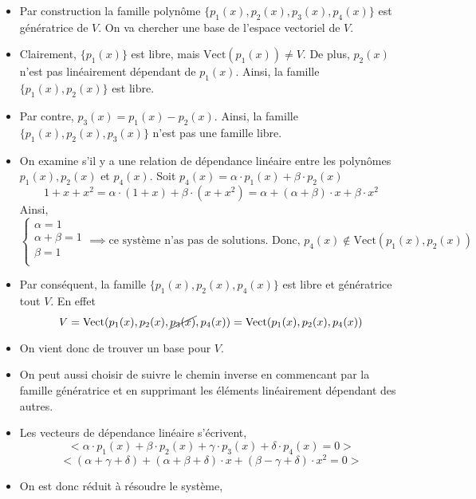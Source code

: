 \documentclass[
    11pt,
    a4paper,
    oneside,
    headinlcude, footinclude,
    twoside,
]{report}
\begin{document}
\begin{itemize}
    \item Par construction la famille polynôme $\{p_{1}(x), p_{2}(x), p_{3}(x),
        p_{4}(x)\}$ est génératrice de $V$. On va chercher une base de
        l'espace vectoriel de $V$.
    \item Clairement, $\{p_{1}(x)\}$ est libre, mais $\text{Vect}(p_{1}(x))
        \neq V$. De plus, $p_{2}(x)$ n'est pas linéairement dépendant de $p_{1}(x)$.
        Ainsi, la famille $\{p_{1}(x), p_{2}(x)\}$ est libre.
    \item Par contre, $p_{3}(x) = p_{1}(x) - p_{2}(x)$. Ainsi, la famille
        $\{p_{1}(x), p_{2}(x), p_{3}(x)\}$ n'est pas une famille libre.
    \item On examine s'il y a une relation de dépendance linéaire entre les
        polynômes $p_{1}(x), p_{2}(x)$ et $p_{4}(x)$. Soit $p_{4}(x) = \alpha
        \cdot p_{1}(x) + \beta \cdot p_{2}(x)$
        $$1 + x + x^{2} = \alpha \cdot (1 + x) + \beta \cdot (x + x^{2}) =
        \alpha + (\alpha + \beta)\cdot x + \beta \cdot x^{2}$$
        Ainsi, 
        $$ \left\{
            \begin{array}{l}
            \alpha = 1\\
            \alpha + \beta = 1\\
            \beta = 1\\
            \end{array}
        \right. \implies  \text{ce système n'as pas de solutions. Donc, }
        p_{4}(x) \notin \text{Vect}(p_{1}(x), p_{2}(x))$$
    \item Par conséquent, la famille $\{p_{1}(x), p_{2}(x), p_{4}(x)\}$ est
        libre et génératrice tout $V$. En effet $$V = \text{Vect}(p_{1}(x),
        p_{2}(x),\cancel{p_{3}(x)}, p_{4}(x)) = \text{Vect}(p_{1}(x), p_{2}(x),
        p_{4}(x))$$

    \item On vient donc de trouver un base pour $V$.

    \item On peut aussi choisir de suivre le chemin inverse en commencant par
        la famille génératrice et en supprimant les éléments linéairement
        dépendant des autres.

    \item Les vecteurs de dépendance linéaire s'écrivent, 
        $$<\alpha \cdot p_{1}(x) + \beta \cdot p_{2}(x) + \gamma \cdot p_{3}(x)
        + \delta \cdot p_{4}(x) = 0>$$
        $$<(\alpha + \gamma + \delta) + (\alpha + \beta + \delta) \cdot x +
        (\beta - \gamma + \delta) \cdot x^{2} = 0>$$
    \item On est donc réduit à résoudre le système, 


\end{itemize}
\end{document}
